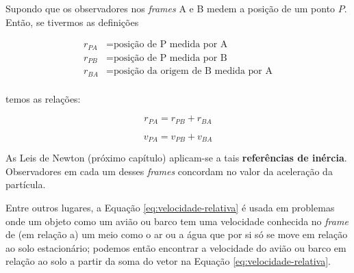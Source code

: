 Supondo que os observadores nos \emph{frames} A e B medem a posição de um ponto $P$. Então, se tivermos as definições

$$
\begin{aligned}
    r_{PA}&=\text{posição de P medida por A} \\
    r_{PB}&=\text{posição de P medida por B} \\
    r_{BA}&=\text{posição da origem de B medida por A} \\
\end{aligned}
$$

temos as relações:

\begin{equation}
    r_{PA}=r_{PB}+r_{BA}
\end{equation}

\begin{equation}\label{eq:velocidade-relativa}
    v_{PA}=v_{PB}+v_{BA}
\end{equation}

As Leis de Newton (próximo capítulo) aplicam-se a tais \textbf{referências de inércia}. Observadores em cada um desses \emph{frames} concordam no valor da aceleração da partícula.

Entre outros lugares, a Equação \ref{eq:velocidade-relativa} é usada em problemas onde um objeto como um avião ou barco tem uma velocidade conhecida no \emph{frame} de (em relação a) um meio como o ar ou a água que por si só se move em relação ao solo estacionário; podemos então encontrar a velocidade do avião ou barco em relação ao solo a partir da soma do vetor na Equação \ref{eq:velocidade-relativa}.